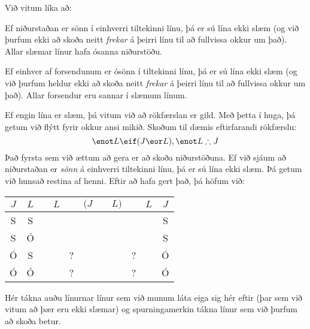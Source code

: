 Við vitum líka að:
\begin{earg}
	\item[\textbullet] Ef niðurstaðan er sönn í einhverri tiltekinni línu, þá er sú lína ekki slæm (og við þurfum ekki að skoða neitt \emph{frekar} á þeirri línu til að fullvissa okkur um það). Allar slæmar línur hafa ósanna niðurstöðu.
	\item[\textbullet] Ef einhver af forsendunum er ósönn í tiltekinni línu, þá er sú lína ekki slæm (og við þurfum heldur ekki að skoða neitt \emph{frekar} á þeirri línu til að fullvissa okkur um það). Allar forsendur eru sannar í slæmum línum.
\end{earg}Ef engin lína er slæm, þá vitum við að rökfærslan er gild. Með þetta í huga, þá getum við flýtt fyrir okkur ansi mikið. Skoðum til dæmis eftirfarandi rökfærslu: 
$$\enot L \eif (J \eor L), \enot L \therefore J$$
Það fyrsta sem við ættum að gera er að skoða niðurstöðuna. Ef við sjáum að niðurstaðan er \emph{sönn} á einhverri tiltekinni línu, þá er sú lína ekki slæm. Þá getum við hunsað restina af henni. Eftir að hafa gert það, þá höfum við:

\begin{center}
	\begin{tabular}{c c|d e e e e f |d f|c}
		$J$&$L$&\enot&$L$&\eif&$(J$&\eor&$L)$&\enot&$L$&$J$\\
		\hline
		S & S & &&&&&&&& {S}\\
		S & Ó & &&&&&&&& {S}\\
		Ó & S & &&?&&&&?&& {Ó}\\
		Ó & Ó & &&?&&&&?&& {Ó}
	\end{tabular}
\end{center}
Hér tákna auðu línurnar línur sem við munum láta eiga sig hér eftir (þar sem við vitum að þær eru ekki slæmar) og spurningamerkin tákna línur sem við þurfum að skoða betur.

